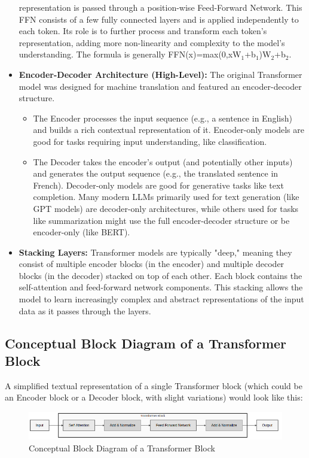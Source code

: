 \begin{itemize}
    representation is passed through a position-wise Feed-Forward Network. This FFN consists of a few fully connected layers and is applied independently to each token. 
    Its role is to further process and transform each token's representation, adding more non-linearity and complexity to the model's understanding.
    The formula is generally FFN(x)=max(0,xW$_{1}$+b$_{1}$)W$_{2}$+b$_{2}$.
    \item \textbf{Encoder-Decoder Architecture (High-Level):} The original Transformer model was designed for machine translation and featured an encoder-decoder 
    structure.
    \begin{itemize}
        \item The Encoder processes the input sequence (e.g., a sentence in English) and builds a rich contextual representation of it. Encoder-only models 
        are good for tasks requiring input understanding, like classification.
        \item The Decoder takes the encoder's output (and potentially other inputs) and generates the output sequence (e.g., the translated sentence in French). 
        Decoder-only models are good for generative tasks like text completion. Many modern LLMs primarily used for text generation (like GPT models) are 
        decoder-only architectures, while others used for tasks like summarization might use the full encoder-decoder structure or be encoder-only (like BERT).
    \end{itemize}
    \item \textbf{Stacking Layers:} Transformer models are typically "deep," meaning they consist of multiple encoder blocks (in the encoder) 
    and multiple decoder blocks (in the decoder) stacked on top of each other. Each block contains the self-attention and feed-forward network components. 
    This stacking allows the model to learn increasingly complex and abstract representations of the input data as it passes through the layers.
\end{itemize}

\subsection*{Conceptual Block Diagram of a Transformer Block}
A simplified textual representation of a single Transformer block (which could be an Encoder block or a Decoder block, with slight variations) would look like this:

\begin{figure}[h!]
\centering
\includegraphics[width=\textwidth]{diagrams/transformer_block.png}
\caption{Conceptual Block Diagram of a Transformer Block}
\label{fig:transformer_block}
\end{figure}

